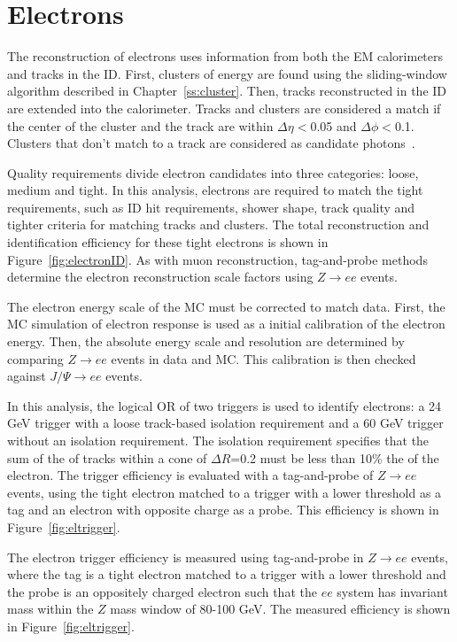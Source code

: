 \section{Electrons}
The reconstruction of electrons uses information from both the EM calorimeters and tracks in the ID. First, clusters of energy are found using the sliding-window algorithm described in Chapter~\ref{ss:cluster}. Then, tracks reconstructed in the ID are extended into the calorimeter. Tracks and clusters are considered a match if the center of the cluster and the track are within $\Delta\eta<$0.05 and $\Delta\phi<$0.1. Clusters that don't match to a track are considered as candidate photons~\cite{Aad:2014fxa}.

Quality requirements divide electron candidates into three categories: loose, medium and tight. In this analysis, electrons are required to match the tight requirements, such as ID hit requirements, shower shape, track quality and tighter criteria for matching tracks and clusters. The total reconstruction and identification efficiency for these tight electrons is shown in Figure~\ref{fig:electronID}. As with muon reconstruction, tag-and-probe methods determine the electron reconstruction scale factors using $Z\rightarrow ee$ events.

The electron energy scale of the MC must be corrected to match data. First, the MC simulation of electron response is used as a initial calibration of the electron energy. Then, the absolute energy scale and resolution are determined by comparing $Z\rightarrow ee$ events in data and MC. This calibration is then checked against $J/\Psi\rightarrow ee$ events.

In this analysis, the logical OR of two triggers is used to identify electrons: a 24 GeV trigger with a loose track-based isolation requirement and a 60 GeV trigger without an isolation requirement. The isolation requirement specifies that the sum of the \pt of tracks within a cone of $\Delta R$=0.2 must be less than 10\% the \pt of the electron. The trigger efficiency is evaluated with a tag-and-probe of $Z\rightarrow ee$ events, using the tight electron matched to a trigger with a lower threshold as a tag and an electron with opposite charge as a probe. This efficiency is shown in Figure~\ref{fig:eltrigger}.

 The electron trigger efficiency is measured using tag-and-probe in $Z\rightarrow ee$ events, where the tag is a tight electron matched to a trigger with a lower threshold and the probe is an oppositely charged electron such that the $ee$ system has invariant mass within the $Z$ mass window of 80-100 GeV. The measured efficiency is shown in Figure~\ref{fig:eltrigger}. 

